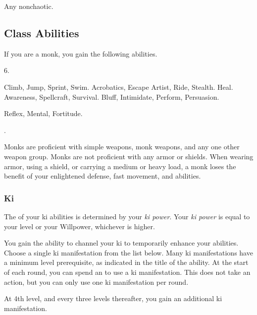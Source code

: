      Any nonchaotic.

    \subsection{Class Abilities}
        If you are a monk, you gain the following abilities.

         6.

         Climb, Jump, Sprint, Swim.
         Acrobatics, Escape Artist, Ride, Stealth.
         Heal.
         Awareness, Spellcraft, Survival.
         Bluff, Intimidate, Perform, Persuasion.

          Reflex,  Mental,  Fortitude.

         .

        Monks are proficient with simple weapons, monk weapons, and any one other weapon group.
        Monks are not proficient with any armor or shields.
        When wearing armor, using a shield, or carrying a medium or heavy load, a monk loses the benefit of your enlightened defense, fast movement, and \ki abilities.


        \subsubsection{Ki}
            The  of your ki abilities is determined by your \textit{ki power}.
            Your \textit{ki power} is equal to your level or your Willpower, whichever is higher.

            You gain the ability to channel your ki to temporarily enhance your abilities.
            Choose a single ki manifestation from the list below.
            Many ki manifestations have a minimum level prerequisite, as indicated in the title of the ability.
            At the start of each round, you can spend an  to use a ki manifestation.
            This does not take an action, but you can only use one ki manifestation per round.

            At 4th level, and every three levels thereafter, you gain an additional ki manifestation.

